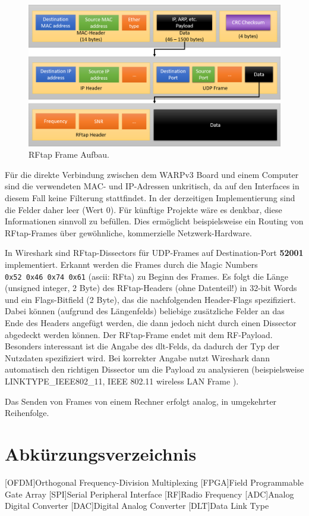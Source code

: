 \documentclass[ngerman,]{scrartcl}
\begin{document}
\begin{figure}
\centering
\includegraphics{rftap.png}
\caption{RFtap Frame Aufbau.\label{fig:rftap}}
\end{figure}

Für die direkte Verbindung zwischen dem WARPv3 Board und einem Computer
sind die verwendeten MAC- und IP-Adressen unkritisch, da auf den
Interfaces in diesem Fall keine Filterung stattfindet. In der
derzeitigen Implementierung sind die Felder daher leer (Wert 0). Für
künftige Projekte wäre es denkbar, diese Informationen sinnvoll zu
befüllen. Dies ermöglicht beispielsweise ein Routing von RFtap-Frames
über gewöhnliche, kommerzielle Netzwerk-Hardware.

In Wireshark sind RFtap-Dissectors für UDP-Frames auf Destination-Port
\textbf{52001} implementiert. Erkannt werden die Frames durch die Magic
Numbers \texttt{0x52\ 0x46\ 0x74\ 0x61} (ascii: RFta) zu Beginn des
Frames. Es folgt die Länge (unsigned integer, 2 Byte) des RFtap-Headers
(ohne Datenteil!) in 32-bit Words und ein Flags-Bitfield (2 Byte), das
die nachfolgenden Header-Flags
spezifiziert\autocite{rftap-specifications}. Dabei können (aufgrund des
Längenfelds) beliebige zusätzliche Felder an das Ende des Headers
angefügt werden, die dann jedoch nicht durch einen Dissector abgedeckt
werden können. Der RFtap-Frame endet mit dem RF-Payload. Besonders
interessant ist die Angabe des \ac{dlt}-Felds, da dadurch der Typ der
Nutzdaten spezifiziert wird. Bei korrekter Angabe nutzt Wireshark dann
automatisch den richtigen Dissector um die Payload zu analysieren
(beispielsweise LINKTYPE\_IEEE802\_11, IEEE 802.11 wireless LAN Frame
\autocite{tcpdump}).

Das Senden von Frames von einem Rechner erfolgt analog, in umgekehrter
Reihenfolge.

\printbibliography

\section*{Abkürzungsverzeichnis}\begin{acronym}[OFDM]
[OFDM]{Orthogonal Frequency-Division Multiplexing}
[FPGA]{Field Programmable Gate Array}
[SPI]{Serial Peripheral Interface}
[RF]{Radio Frequency}
[ADC]{Analog Digital Converter}
[DAC]{Digital Analog Converter}
[DLT]{Data Link Type}
\end{acronym}
\end{document}
